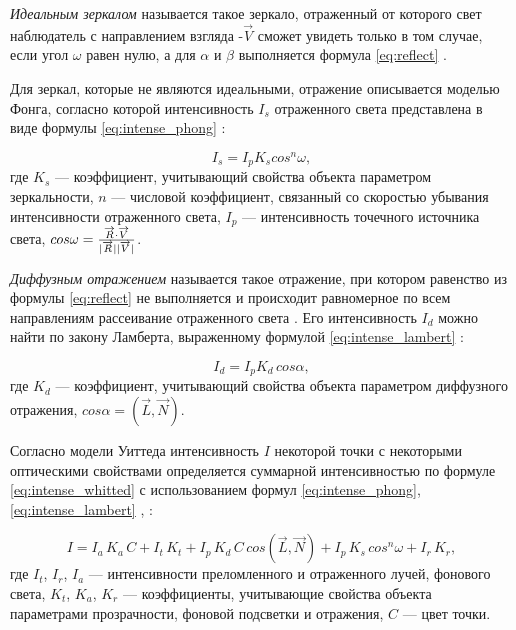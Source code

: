 \textit{Идеальным зеркалом} называется такое зеркало, отраженный от которого свет наблюдатель с направлением взгляда -$\overrightarrow V$ сможет увидеть только в том случае, если угол $\omega$ равен нулю, а для $\alpha$ и $\beta$ выполняется формула \ref{eq:reflect} \cite{порев2002компьютерная}.

Для зеркал, которые не являются идеальными, отражение описывается моделью Фонга, согласно которой интенсивность $I_s$ отраженного света представлена в виде формулы \ref{eq:intense_phong} \cite{порев2002компьютерная}:

\begin{equation}\label{eq:intense_phong}
	I_s=I_p K_s cos^n{\omega},
\end{equation}
где $K_s$ --- коэффициент, учитывающий свойства объекта параметром зеркальности, $n$ --- числовой коэффициент, связанный со скоростью убывания интенсивности отраженного света, $I_p$ --- интенсивность точечного источника света, $cos{\omega} = \frac{\overrightarrow{R} \cdot \overrightarrow{V}}{\lvert\overrightarrow{R}\rvert\lvert\overrightarrow{V}\rvert}$.

\textit{Диффузным отражением} называется такое отражение, при котором равенство из формулы \ref{eq:reflect} не выполняется и происходит равномерное по всем направлениям рассеивание отраженного света \cite{порев2002компьютерная}.
Его интенсивность $I_d$ можно найти по закону Ламберта, выраженному формулой \ref{eq:intense_lambert} \cite{порев2002компьютерная}:

\begin{equation}\label{eq:intense_lambert}
	I_d=I_p K_d \, cos{\alpha},
\end{equation}
где $K_d$ --- коэффициент, учитывающий свойства объекта параметром диффузного отражения, $cos{\alpha} = (\overrightarrow L, \overrightarrow N)$.

Согласно модели Уиттеда интенсивность $I$ некоторой точки  с некоторыми оптическими свойствами определяется суммарной интенсивностью по формуле \ref{eq:intense_whitted} с использованием формул \ref{eq:intense_phong}, \ref{eq:intense_lambert} \cite{порев2002компьютерная}, \cite{боресков}:

\begin{equation}\label{eq:intense_whitted}
	I = I_a \, K_a \, C + I_t \, K_t + I_p \, K_d \, C \, cos(\overrightarrow L, \overrightarrow N) + I_p \, K_s \, cos^n{\omega} + I_r \, K_r,
\end{equation}
где $I_t$, $I_r$, $I_a$ --- интенсивности преломленного и отраженного лучей, фонового света, $K_t$, $K_a$, $K_r$ --- коэффициенты, учитывающие свойства объекта параметрами прозрачности, фоновой подсветки и отражения, $C$ --- цвет точки.

